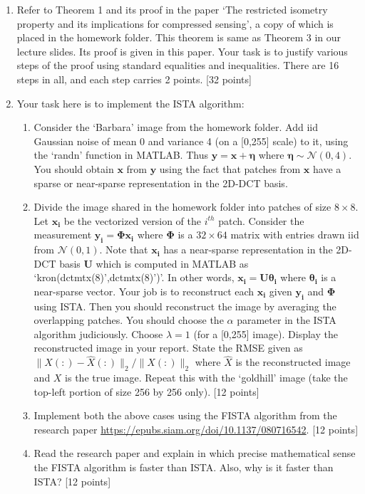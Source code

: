 \documentclass[11pt]{article}
\begin{document}
\begin{enumerate}
\item Refer to Theorem 1 and its proof in the paper `The restricted isometry property and its implications for compressed sensing', a copy of which is placed in the homework folder. This theorem is same as Theorem 3 in our lecture slides. Its proof is given in this paper. Your task is to justify various steps of the proof using standard equalities and inequalities. There are 16 steps in all, and each step carries 2 points. \textsf{[32 points]} 

\item Your task here is to implement the ISTA algorithm:
\begin{enumerate}
\item Consider the `Barbara' image from the homework folder. Add iid Gaussian noise of mean 0 and variance 4 (on a [0,255] scale) to it, using the `randn' function in MATLAB. Thus $\boldsymbol{y} = \boldsymbol{x} + \boldsymbol{\eta}$ where $\boldsymbol{\eta} \sim \mathcal{N}(0,4)$. You should obtain $\boldsymbol{x}$ from $\boldsymbol{y}$ using the fact that patches from $\boldsymbol{x}$ have a sparse or near-sparse representation in the 2D-DCT basis. 
\item Divide the image shared in the homework folder into patches of size $8 \times 8$. Let $\boldsymbol{x_i}$ be the vectorized version of the $i^{th}$ patch. Consider the measurement $\boldsymbol{y_i} = \boldsymbol{\Phi x_i}$ where $\boldsymbol{\Phi}$ is a $32 \times 64$ matrix with entries drawn iid from $\mathcal{N}(0,1)$. Note that $\boldsymbol{x_i}$ has a near-sparse representation in the 2D-DCT basis $\boldsymbol{U}$ which is computed in MATLAB as `kron(dctmtx(8)',dctmtx(8)')'. In other words, $\boldsymbol{x_i} = \boldsymbol{U \theta_i}$ where $\boldsymbol{\theta_i}$ is a near-sparse vector. Your job is to reconstruct each $\boldsymbol{x_i}$ given $\boldsymbol{y_i}$ and $\boldsymbol{\Phi}$ using ISTA. Then you should reconstruct the image by averaging the overlapping patches. You should choose the $\alpha$ parameter in the ISTA algorithm judiciously. Choose $\lambda = 1$ (for a [0,255] image). Display the reconstructed image in your report. State the RMSE given as $\|X(:)-\hat{X}(:)\|_2/\|X(:)\|_2$ where $\hat{X}$ is the reconstructed image and $X$ is the true image. Repeat this with the `goldhill' image (take the top-left portion of size 256 by 256 only). \textsf{[12 points]}
\item Implement both the above cases using the FISTA algorithm from the research paper \url{https://epubs.siam.org/doi/10.1137/080716542}. \textsf{[12 points]}
\item Read the research paper and explain in which precise mathematical sense the FISTA algorithm is faster than ISTA. Also, why is it faster than ISTA? \textsf{[12 points]}
\end{enumerate}


\end{enumerate}
\end{document}
